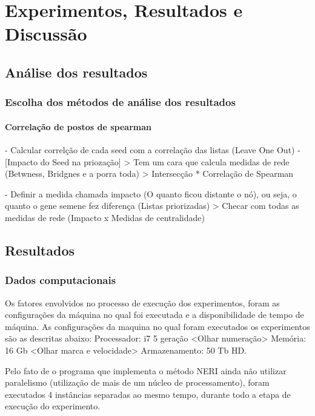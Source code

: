 \chapter[Experimentos, Resultados e Discussão]{Experimentos, Resultados e Discussão}

\section{Análise dos resultados}

	\subsection{Escolha dos métodos de análise dos resultados}
		\subsubsection{Correlação de postos de spearman}
		
		- Calcular correlção de cada seed com a correlação das listas (Leave One Out) - [Impacto do Seed na priozação]
 \-> Tem um cara que calcula medidas de rede (Betwness, Bridgnes e a porra toda)
 \-> Intersecção * Correlação de Spearman

- Definir a medida chamada impacto (O quanto ficou distante o nó), ou seja, o quanto o gene semene fez diferença (Listas priorizadas)
 \-> Checar com todas as medidas de rede (Impacto x Medidas de centralidade)


\section{Resultados}


\subsection{Dados computacionais}
Os fatores envolvidos no processo de execução dos experimentos, foram as configurações da máquina no qual foi executada e a disponibilidade de tempo de máquina.
As configurações da maquina no qual foram executados os experimentos são as descritas abaixo:
Processador: i7 5 geração <Olhar numeração>
Memória: 16 Gb <Olhar marca e velocidade>
Armazenamento: 50 Tb HD.
 
Pelo fato de o programa que implementa o método NERI ainda não utilizar paralelismo (utilização de mais de um núcleo de processamento), foram executados 4 instâncias separadas ao mesmo tempo, durante todo a etapa de execução do experimento.

